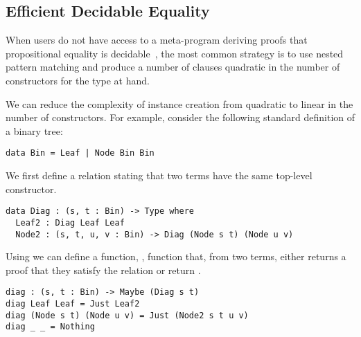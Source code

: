 \subsection{Efficient Decidable Equality}
\label{sec:idioms:decEq}

When users do not have access to a meta-program deriving proofs that propositional
equality is decidable~\cite{DBLP:conf/icfp/ChristiansenB16},
the most common strategy is to use nested pattern matching and produce
a number of clauses quadratic in the number of constructors for the type at hand.



We can reduce the complexity of  instance creation from quadratic
to linear in the number of constructors.
For example, consider the following standard definition of a binary tree:

\begin{verbatim}
data Bin = Leaf | Node Bin Bin
\end{verbatim}

\noindent
We first define a  relation stating that two terms have the same
top-level constructor.

\begin{verbatim}
data Diag : (s, t : Bin) -> Type where
  Leaf2 : Diag Leaf Leaf
  Node2 : (s, t, u, v : Bin) -> Diag (Node s t) (Node u v)
\end{verbatim}

\noindent
Using  we can define a function, , function that, from two terms, either returns a proof that they satisfy the  relation or return .

\begin{verbatim}
diag : (s, t : Bin) -> Maybe (Diag s t)
diag Leaf Leaf = Just Leaf2
diag (Node s t) (Node u v) = Just (Node2 s t u v)
diag _ _ = Nothing
\end{verbatim}

